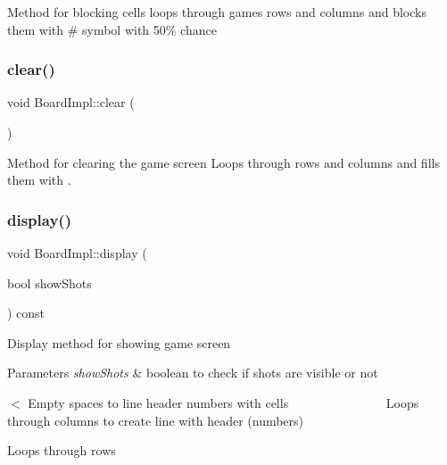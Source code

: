 Method for blocking cells loops through game\textquotesingle{}s rows and columns and blocks them with \textquotesingle{}\#\textquotesingle{} symbol with 50\% chance \mbox{\label{class_board_impl_a47c7733ed5ec7a09fe9710f443fe0952}} 
\subsubsection{\texorpdfstring{clear()}{clear()}}
{\footnotesize\ttfamily void Board\+Impl\+::clear (\begin{DoxyParamCaption}{ }\end{DoxyParamCaption})}

Method for clearing the game screen Loops through rows and columns and fills them with \textquotesingle{}.\textquotesingle{} \mbox{\label{class_board_impl_a4b600b257cfe79f10ac8792ab69eb388}} 
\subsubsection{\texorpdfstring{display()}{display()}}
{\footnotesize\ttfamily void Board\+Impl\+::display (\begin{DoxyParamCaption}\item[{bool}]{show\+Shots }\end{DoxyParamCaption}) const}

Display method for showing game screen 
\begin{DoxyParams}{Parameters}
{\em show\+Shots} & boolean to check if shots are visible or not \\
\hline
\end{DoxyParams}
$<$ Empty spaces to line header numbers with cells ~\newline
~\newline
~\newline
~\newline
~\newline
~\newline
~\newline
~\newline
~\newline
 Loops through columns to create line with header (numbers)

Loops through rows

